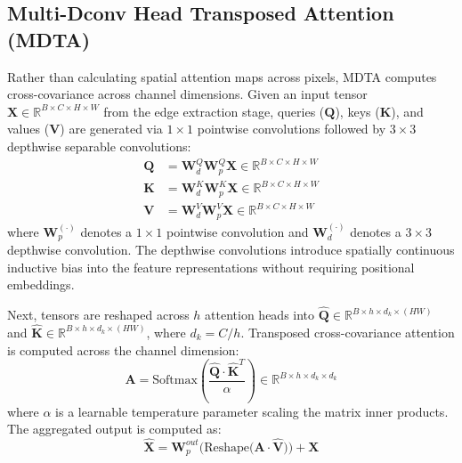 \documentclass[10pt,twocolumn,letterpaper]{article}
\begin{document}
\subsection{Multi-Dconv Head Transposed Attention (MDTA)}
Rather than calculating spatial attention maps across pixels, MDTA computes cross-covariance across channel dimensions. Given an input tensor $\mathbf{X} \in \mathbb{R}^{B \times C \times H \times W}$ from the edge extraction stage, queries ($\mathbf{Q}$), keys ($\mathbf{K}$), and values ($\mathbf{V}$) are generated via $1\times 1$ pointwise convolutions followed by $3\times 3$ depthwise separable convolutions:
\begin{align}
\mathbf{Q} &= \mathbf{W}_d^Q \mathbf{W}_p^Q \mathbf{X} \in \mathbb{R}^{B \times C \times H \times W} \\
\mathbf{K} &= \mathbf{W}_d^K \mathbf{W}_p^K \mathbf{X} \in \mathbb{R}^{B \times C \times H \times W} \\
\mathbf{V} &= \mathbf{W}_d^V \mathbf{W}_p^V \mathbf{X} \in \mathbb{R}^{B \times C \times H \times W}
\end{align}
where $\mathbf{W}_p^{(\cdot)}$ denotes a $1\times 1$ pointwise convolution and $\mathbf{W}_d^{(\cdot)}$ denotes a $3\times 3$ depthwise convolution. The depthwise convolutions introduce spatially continuous inductive bias into the feature representations without requiring positional embeddings.

Next, tensors are reshaped across $h$ attention heads into $\hat{\mathbf{Q}} \in \mathbb{R}^{B \times h \times d_k \times (HW)}$ and $\hat{\mathbf{K}} \in \mathbb{R}^{B \times h \times d_k \times (HW)}$, where $d_k = C / h$. Transposed cross-covariance attention is computed across the channel dimension:
\begin{equation}
\mathbf{A} = \text{Softmax}\left( \frac{\hat{\mathbf{Q}} \cdot \hat{\mathbf{K}}^T}{\alpha} \right) \in \mathbb{R}^{B \times h \times d_k \times d_k}
\label{eq:mdta_attention}
\end{equation}
where $\alpha$ is a learnable temperature parameter scaling the matrix inner products. The aggregated output is computed as:
\begin{equation}
\hat{\mathbf{X}} = \mathbf{W}_p^{out} \Big( \text{Reshape}\big( \mathbf{A} \cdot \hat{\mathbf{V}} \big) \Big) + \mathbf{X}
\end{equation}
\end{document}

